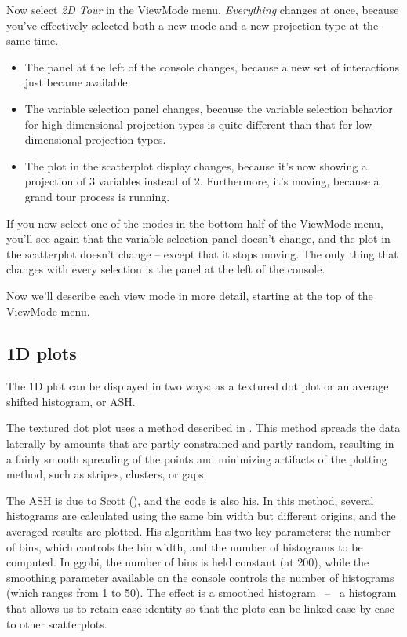 \documentclass[11pt]{article}
\begin{document}
Now select {\em 2D Tour} in the ViewMode menu.  {\em Everything}
changes at once, because you've effectively selected both a new mode and
a new projection type at the same time.
\begin{itemize}
\itemsep 0em
\item The panel at the left of the console changes, because a
      new set of interactions just became available.
\item The variable selection panel changes, because the variable
      selection behavior for high-dimensional projection types is
      quite different than that for low-dimensional projection types.
\item The plot in the scatterplot display changes, because it's
      now showing a projection of 3 variables instead of 2.  Furthermore,
      it's moving, because a grand tour process is running.
\end{itemize}

If you now select one of the modes in the bottom half of the ViewMode
menu, you'll see again that the variable selection panel doesn't
change, and the plot in the scatterplot doesn't change -- except
that it stops moving.  The only thing that changes with every
selection is the panel at the left of the console.

Now we'll describe each view mode in more detail, starting at the
top of the ViewMode menu. 

\subsection{1D plots}

The 1D plot can be displayed in two ways:  as a textured dot plot
or an average shifted histogram, or ASH.

The textured dot plot uses a method described in \cite{TukeyTukey90}.
This method spreads the data laterally by amounts that are partly
constrained and partly random, resulting in a fairly smooth spreading
of the points and minimizing artifacts of the plotting method, such as
stripes, clusters, or gaps.

The ASH is due to Scott (\cite{Scott92}), and the code is also his.
In this method, several histograms are calculated using the same bin
width but different origins, and the averaged results are plotted.
His algorithm has two key parameters: the number of bins, which controls
the bin width, and the number of histograms to be computed.  In ggobi,
the number of bins is held constant (at 200), while the smoothing
parameter available on the console controls the number of histograms
(which ranges from 1 to 50).  The effect is a smoothed histogram ~--~
a histogram that allows us to retain case identity so that the plots
can be linked case by case to other scatterplots.
\end{document}
